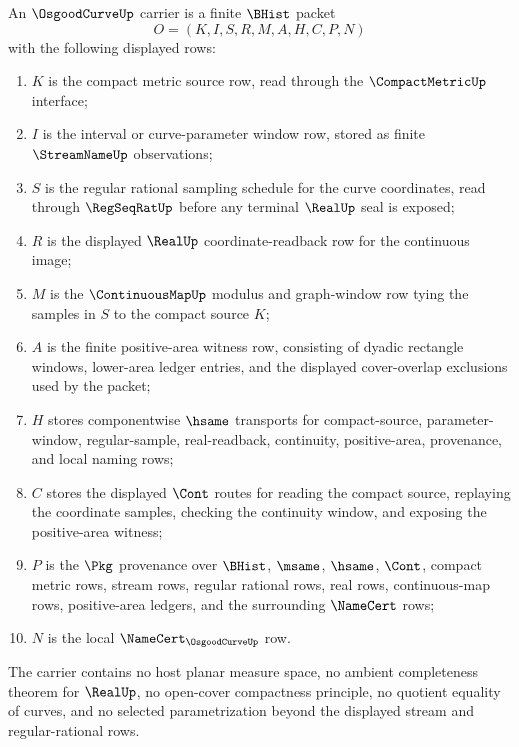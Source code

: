 \begin{definition}
\label{def:osgood-curve-carrier}
An $\OsgoodCurveUp$ carrier is a finite $\BHist$ packet
$$
O=(K,I,S,R,M,A,H,C,P,N)
$$
with the following displayed rows:
\begin{enumerate}
\item $K$ is the compact metric source row, read through the $\CompactMetricUp$ interface;
\item $I$ is the interval or curve-parameter window row, stored as finite $\StreamNameUp$ observations;
\item $S$ is the regular rational sampling schedule for the curve coordinates, read through $\RegSeqRatUp$ before any terminal $\RealUp$ seal is exposed;
\item $R$ is the displayed $\RealUp$ coordinate-readback row for the continuous image;
\item $M$ is the $\ContinuousMapUp$ modulus and graph-window row tying the samples in $S$ to the compact source $K$;
\item $A$ is the finite positive-area witness row, consisting of dyadic rectangle windows, lower-area ledger entries, and the displayed cover-overlap exclusions used by the packet;
\item $H$ stores componentwise $\hsame$ transports for compact-source, parameter-window, regular-sample, real-readback, continuity, positive-area, provenance, and local naming rows;
\item $C$ stores the displayed $\Cont$ routes for reading the compact source, replaying the coordinate samples, checking the continuity window, and exposing the positive-area witness;
\item $P$ is the $\Pkg$ provenance over $\BHist$, $\msame$, $\hsame$, $\Cont$, compact metric rows, stream rows, regular rational rows, real rows, continuous-map rows, positive-area ledgers, and the surrounding $\NameCert$ rows;
\item $N$ is the local $\NameCert_{\OsgoodCurveUp}$ row.
\end{enumerate}
The carrier contains no host planar measure space, no ambient completeness theorem for $\RealUp$, no open-cover compactness principle, no quotient equality of curves, and no selected parametrization beyond the displayed stream and regular-rational rows.
\end{definition}

